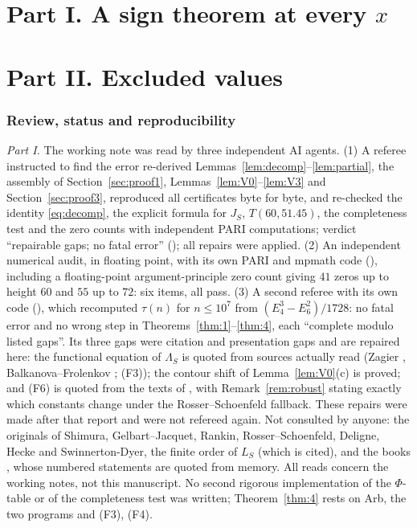 \documentclass[11pt]{amsart}
\theoremstyle{definition}
\numberwithin{equation}{section}
\begin{document}
\part*{Part I. A sign theorem at every \texorpdfstring{$x$}{x}}


\part*{Part II. Excluded values}


\section{Review, status and reproducibility}\label{sec:review}

\emph{Part I.} The working note  was read by three independent AI agents. (1) A referee instructed to find the error re-derived Lemmas~\ref{lem:decomp}--\ref{lem:partial}, the assembly of Section~\ref{sec:proof1}, Lemmas~\ref{lem:V0}--\ref{lem:V3} and Section~\ref{sec:proof3}, reproduced all certificates byte for byte, and re-checked the identity \eqref{eq:decomp}, the explicit formula for $J_S$, $T(60,51.45)$, the completeness test and the zero counts with independent PARI computations; verdict ``repairable gaps; no fatal error'' (); all repairs were applied. (2) An independent numerical audit, in floating point, with its own PARI and mpmath code (), including a floating-point argument-principle zero count giving $41$ zeros up to height $60$ and $55$ up to $72$: six items, all pass. (3) A second referee with its own code (), which recomputed $\tau(n)$ for $n\le10^7$ from $(E_4^3-E_6^2)/1728$: no fatal error and no wrong step in Theorems~\ref{thm:1}--\ref{thm:4}, each ``complete modulo listed gaps''. Its three gaps were citation and presentation gaps and are repaired here: the functional equation of $\Lambda_S$ is quoted from sources actually read (Zagier \cite{Zagier}, Balkanova--Frolenkov \cite{BF}; (F3)); the contour shift of Lemma~\ref{lem:V0}(c) is proved; and (F6) is quoted from the texts of \cite{BKLNW,Dusart}, with Remark~\ref{rem:robust} stating exactly which constants change under the Rosser--Schoenfeld fallback. These repairs were made after that report and were not refereed again. Not consulted by anyone: the originals of Shimura, Gelbart--Jacquet, Rankin, Rosser--Schoenfeld, Deligne, Hecke and Swinnerton-Dyer, the finite order of $L_S$ (which is cited), and the books \cite{IK,MV}, whose numbered statements are quoted from memory. All reads concern the working notes, not this manuscript. No second rigorous implementation of the $\Phi$-table or of the completeness test was written; Theorem~\ref{thm:4} rests on Arb, the two programs and (F3), (F4).
\end{document}
